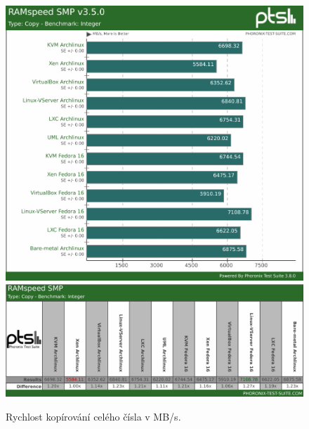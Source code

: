 \begin{figure}[h!]
  \centering
  \includegraphics[width=15cm]{obr/bench/ramspeed-graph}
  \includegraphics[width=15cm]{obr/bench/ramspeed-table}
  \caption{Rychlost kopírování celého čísla v MB/s.}
  \label{obr:bench:ramspeed}
\end{figure}



